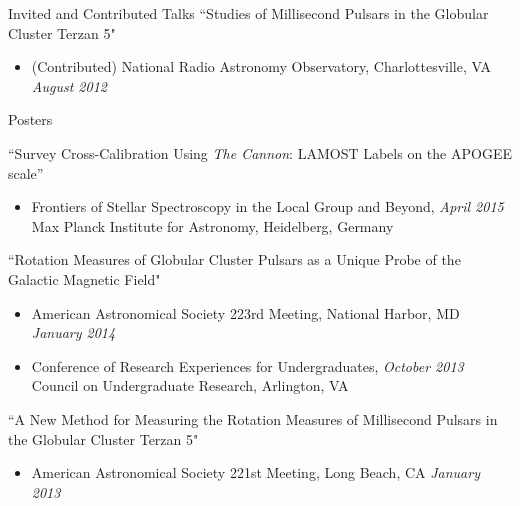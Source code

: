 \documentclass{resume} %
\begin{document}
\begin{rSection}{Invited and Contributed Talks}
``Studies of Millisecond Pulsars in the Globular Cluster Terzan 5" 
\begin{itemize}
\item
(Contributed) National Radio Astronomy Observatory, 
Charlottesville, VA \hfill {\em August 2012} 
\end{itemize}

\end{rSection}


\begin{rSection}{Posters}

``Survey Cross-Calibration Using \emph{The Cannon}:
LAMOST Labels on the APOGEE scale''
\begin{itemize}
  \item
    Frontiers of Stellar Spectroscopy in the Local Group and Beyond,
    \hfill {\em April 2015}\\
    Max Planck Institute for Astronomy, Heidelberg, Germany 

\end{itemize}

``Rotation Measures of Globular Cluster Pulsars as a Unique Probe of the Galactic Magnetic Field"
\begin{itemize}
\item
American Astronomical Society 223rd Meeting, 
National Harbor, MD \hfill {\em January 2014}
\item
Conference of Research Experiences for Undergraduates, \hfill {\em October 2013}\\
Council on Undergraduate Research, Arlington, VA 
\end{itemize}

``A New Method for Measuring the Rotation Measures of Millisecond Pulsars in the Globular Cluster Terzan 5" 
\begin{itemize}
\item
American Astronomical Society 221st Meeting, 
Long Beach, CA \hfill {\em January 2013}
\end{itemize}

\end{rSection}

\end{document}
